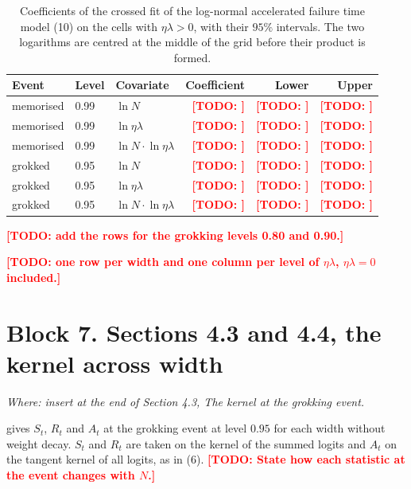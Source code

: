 \documentclass[a4paper,11pt]{article} %
\newcommand{\citetas}[2]{#2}
\newcommand{\gref}[2]{#2}
\newcommand{\TODO}[1]{\textcolor{red}{\textbf{[TODO: #1]}}}
\newcommand{\where}[1]{\par\smallskip\noindent\textit{\small Where: #1}\par\smallskip}
\begin{document}
\begin{table}[H]
  \centering
  \caption{Coefficients of the crossed fit of the log-normal accelerated
    failure time model \gref{eq:aft}{(10)} on the cells with $\eta\lambda>0$,
    with their $95\%$ intervals. The two logarithms are centred at the middle of
    the grid before their product is formed.}
  \label{tab:crossed}
  \begin{tabular}{lllrrr}
    \toprule
    Event & Level & Covariate & Coefficient & Lower & Upper \\
    \midrule
    memorised & 0.99 & $\ln N$                      & \TODO{} & \TODO{} & \TODO{} \\
    memorised & 0.99 & $\ln\eta\lambda$             & \TODO{} & \TODO{} & \TODO{} \\
    memorised & 0.99 & $\ln N\cdot\ln\eta\lambda$   & \TODO{} & \TODO{} & \TODO{} \\
    grokked   & 0.95 & $\ln N$                      & \TODO{} & \TODO{} & \TODO{} \\
    grokked   & 0.95 & $\ln\eta\lambda$             & \TODO{} & \TODO{} & \TODO{} \\
    grokked   & 0.95 & $\ln N\cdot\ln\eta\lambda$   & \TODO{} & \TODO{} & \TODO{} \\
    \bottomrule
  \end{tabular}

  \smallskip
  \TODO{add the rows for the grokking levels 0.80 and 0.90.}
\end{table}

\begin{table}[H]
  \centering
  \caption{Phase of the runs of the width arm at the last step, at the
    threshold $0.9$, following
    \citetas{pracherSpectralTheoryGrokking2026}{Pracher et al. (2026)}. Each
    entry gives the number of seeds that grok, memorise, forget or do not fit.}
  \label{tab:widthphases}
  \TODO{one row per width and one column per level of $\eta\lambda$,
    $\eta\lambda=0$ included.}
\end{table}

\section*{Block 7. Sections 4.3 and 4.4, the kernel across width}
\where{insert at the end of Section 4.3, The kernel at the grokking event.}

 gives $S_t$, $R_t$ and $A_t$ at the grokking event at
level $0.95$ for each width without weight decay. $S_t$ and $R_t$ are taken on
the kernel of the summed logits and $A_t$ on the tangent kernel of all logits,
as in \gref{eq:statistics}{(6)}. \TODO{State how each statistic at the event
changes with $N$.}
\end{document}
